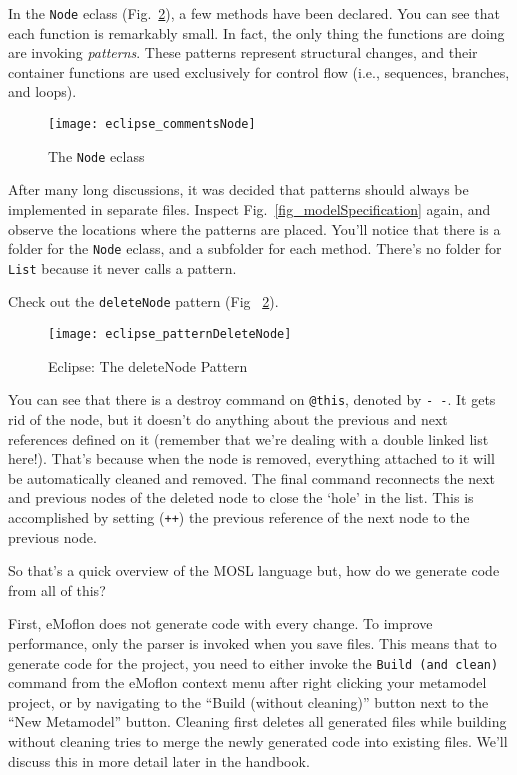 In the \texttt{Node} eclass (Fig.~\ref{fig_patternDeleteNode}), a few methods have been declared. You can see that each function is remarkably small. In fact,
the only thing the functions are doing are invoking \emph{patterns}. These patterns represent structural changes, and their container functions are used
exclusively for control flow (i.e., sequences, branches, and loops).

 \begin{figure}[htbp]
  \centering
  \texttt{[image: eclipse\_commentsNode]}
  \caption{The \texttt{Node} eclass}
  \label{fig_eclassNode}
\end{figure}

After many long discussions, it was decided that patterns should always be implemented in separate files. Inspect Fig.~\ref{fig_modelSpecification} again, and
observe the locations where the patterns are placed. You'll notice that there is a folder for the \texttt{Node} eclass, and a subfolder for each method. There's
no folder for \texttt{List} because it never calls a pattern.

Check out the \texttt{deleteNode} pattern (Fig ~\ref{fig_patternDeleteNode}).

 \begin{figure}[htbp]
  \centering
  \texttt{[image: eclipse\_patternDeleteNode]}
  \caption{Eclipse: The deleteNode Pattern}
  \label{fig_patternDeleteNode}
\end{figure}

You can see that there is a destroy command on \texttt{@this}, denoted by \texttt{-~-}. It gets rid of the node, but it doesn't do anything about the previous
and next references defined on it (remember that we're dealing with a double linked list here!). That's because when the node is removed, everything attached to it
will be automatically cleaned and removed. The final command reconnects the next and previous nodes of the deleted node to close the `hole' in the list. This is
accomplished by setting (\texttt{++}) the previous reference of the next node to the previous node.
 
So that's a quick overview of the MOSL language but, how do we generate code from all of this?

First, eMoflon does not generate code with every change. To improve performance, only the parser is invoked when you save files. This means
that to generate code for the project, you need to either invoke the \texttt{Build (and clean)} command from the eMoflon context menu after right clicking your
metamodel project, or by navigating to the ``Build (without cleaning)'' button next to the ``New Metamodel'' button. Cleaning first deletes all generated files
while building without cleaning tries to merge the newly generated code into existing files. We'll discuss this in more detail later in the handbook.
